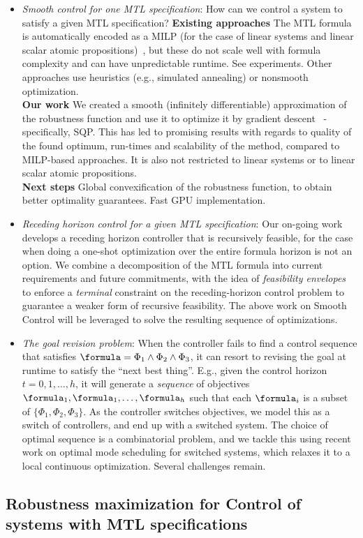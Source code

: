 \begin{itemize}
\item \textit{Smooth control for one MTL specification}: How can we control a system to satisfy a given MTL specification?
\textbf{Existing approaches} The MTL formula is automatically encoded as a MILP (for the case of linear systems and linear scalar atomic propositions)~\cite{Raman14_MPCSTL}, but these do not scale well with formula complexity and can have unpredictable runtime. See experiments.
Other approaches use heuristics (e.g., simulated annealing) or nonsmooth optimization.
\\
\textbf{Our work} We created a smooth (infinitely differentiable) approximation of the robustness function and use it to optimize it by gradient descent~\cite{PantAM17_SmoothOpTechRpt} - specifically, SQP.
This has led to promising results with regards to quality of the found optimum, run-times and scalability of the method, compared to MILP-based approaches. It is also not restricted to linear systems or to linear scalar atomic propositions.
\\
\textbf{Next steps} Global convexification of the robustness function, to obtain better optimality guarantees. Fast GPU implementation.

\item \textit{Receding horizon control for a given MTL specification}: Our on-going work develops a receding horizon controller that is recursively feasible, for the case when doing a one-shot optimization over the entire formula horizon is not an option. 
We combine a decomposition of the MTL formula into current requirements and future commitments, with the idea of \textit{feasibility envelopes}\cite{Belta_FE_CDC16} to enforce a \textit{terminal} constraint on the receding-horizon control problem to guarantee a weaker form of recursive feasibility. 
The above work on Smooth Control will be leveraged to solve the resulting sequence of optimizations.

\item \textit{The goal revision problem}: When the controller fails to find a control sequence that satisfies $\formula=\Phi_1 \land \Phi_2 \land \Phi_3$, it can resort to revising the goal at runtime to satisfy the ``next best thing''.
E.g., given the control horizon $t=0,1,\ldots,h$, it will generate a \textit{sequence} of objectives $\formula_1,\formula_1,\ldots,\formula_h$ such that each $\formula_i$ is a subset of $\{\Phi_1 , \Phi_2 , \Phi_3\}$.
As the controller switches objectives, we model this as a switch of controllers, and end up with a switched system.
The choice of optimal sequence is a combinatorial problem, and we tackle this using recent work on optimal mode scheduling for switched systems, which relaxes it to a local continuous optimization.
Several challenges remain.

\end{itemize}

\subsection{Robustness maximization for Control of systems with MTL specifications}

